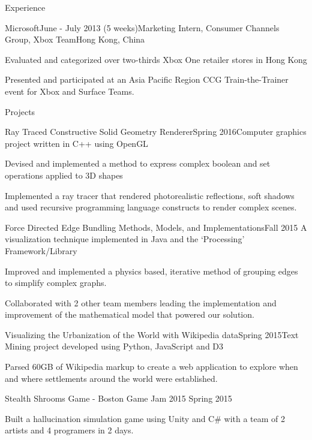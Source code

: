 \documentclass{resume}
\begin{document}
\begin{rSection}{Experience}
    \begin{rSubsection}{Microsoft}{June - July 2013 (5 weeks)}{Marketing Intern, Consumer Channels Group, Xbox Team}{Hong Kong, China}
    \item Evaluated and categorized over two-thirds Xbox One retailer stores in Hong Kong
    \item Presented and participated at an Asia Pacific Region CCG Train-the-Trainer event for Xbox and Surface Teams.
    \end{rSubsection}
  
  \end{rSection}

  \begin{rSection}{Projects}
    \begin{rSubsection}{Ray Traced Constructive Solid Geometry Renderer}{Spring 2016}{Computer graphics project written in C++ using OpenGL}{ }
    \item Devised and implemented a method to express complex boolean and set operations applied to 3D shapes
    \item Implemented a ray tracer that rendered photorealistic reflections, soft shadows and used recursive programming language constructs to render complex scenes.
    \end{rSubsection}
    \begin{rSubsection}{Force Directed Edge Bundling Methods, Models, and Implementations}{Fall 2015}
    {A visualization technique implemented in Java and the `Processing' Framework/Library} {}
    \item Improved and implemented a physics based, iterative method of grouping edges to simplify complex graphs.
    \item Collaborated with 2 other team members leading the implementation and improvement of the mathematical model that powered our solution.
    \end{rSubsection}
    \begin{rSubsection}{Visualizing the Urbanization of the World with Wikipedia data}{Spring 2015}{Text Mining project developed using Python, JavaScript and D3}{}
    \item Parsed 60GB of Wikipedia markup to create a web application to explore when and where settlements around the world were established.
    \end{rSubsection}
    \begin{rSubsection}{Stealth Shrooms Game - Boston Game Jam 2015} {Spring 2015} {}{}
    \item Built a hallucination simulation game using Unity and C\# with a team of 2 artists and 4 programers in 2 days.

\end{rSubsection}
\end{rSection}
\end{document}
